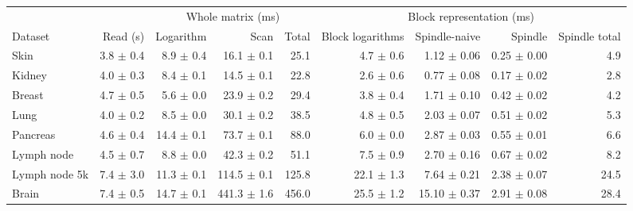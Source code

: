 \begin{tabular}{lrrrrrrrr}
\toprule
 &  & \multicolumn{3}{c}{Whole matrix (ms)} & \multicolumn{4}{c}{Block representation (ms)} \\
\cmidrule(lr){3-5} \cmidrule(lr){6-9}
Dataset & Read (s) & Logarithm & Scan & Total & Block logarithms & Spindle-naive & Spindle & Spindle total \\
\midrule
Skin & 3.8 $\pm$ 0.4 & 8.9 $\pm$ 0.4 & 16.1 $\pm$ 0.1 & 25.1 & 4.7 $\pm$ 0.6 & 1.12 $\pm$ 0.06 & 0.25 $\pm$ 0.00 & 4.9 \\
Kidney & 4.0 $\pm$ 0.3 & 8.4 $\pm$ 0.1 & 14.5 $\pm$ 0.1 & 22.8 & 2.6 $\pm$ 0.6 & 0.77 $\pm$ 0.08 & 0.17 $\pm$ 0.02 & 2.8 \\
Breast & 4.7 $\pm$ 0.5 & 5.6 $\pm$ 0.0 & 23.9 $\pm$ 0.2 & 29.4 & 3.8 $\pm$ 0.4 & 1.71 $\pm$ 0.10 & 0.42 $\pm$ 0.02 & 4.2 \\
Lung & 4.0 $\pm$ 0.2 & 8.5 $\pm$ 0.0 & 30.1 $\pm$ 0.2 & 38.5 & 4.8 $\pm$ 0.5 & 2.03 $\pm$ 0.07 & 0.51 $\pm$ 0.02 & 5.3 \\
Pancreas & 4.6 $\pm$ 0.4 & 14.4 $\pm$ 0.1 & 73.7 $\pm$ 0.1 & 88.0 & 6.0 $\pm$ 0.0 & 2.87 $\pm$ 0.03 & 0.55 $\pm$ 0.01 & 6.6 \\
Lymph node & 4.5 $\pm$ 0.7 & 8.8 $\pm$ 0.0 & 42.3 $\pm$ 0.2 & 51.1 & 7.5 $\pm$ 0.9 & 2.70 $\pm$ 0.16 & 0.67 $\pm$ 0.02 & 8.2 \\
Lymph node 5k & 7.4 $\pm$ 3.0 & 11.3 $\pm$ 0.1 & 114.5 $\pm$ 0.1 & 125.8 & 22.1 $\pm$ 1.3 & 7.64 $\pm$ 0.21 & 2.38 $\pm$ 0.07 & 24.5 \\
Brain & 7.4 $\pm$ 0.5 & 14.7 $\pm$ 0.1 & 441.3 $\pm$ 1.6 & 456.0 & 25.5 $\pm$ 1.2 & 15.10 $\pm$ 0.37 & 2.91 $\pm$ 0.08 & 28.4 \\
\bottomrule
\end{tabular}
